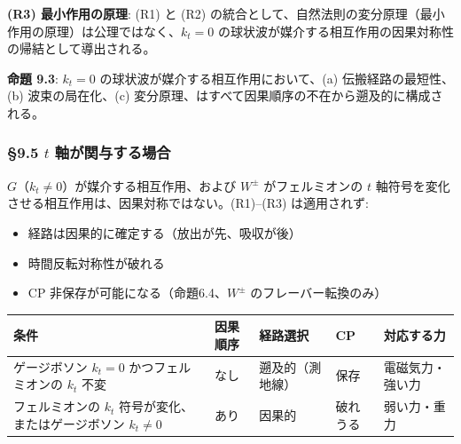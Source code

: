 \documentclass[
  a4paper,11pt]{ltjsarticle}
\newcounter{none}
\providecommand{\tightlist}{%
  \setlength{\itemsep}{0pt}\setlength{\parskip}{0pt}}
\theoremstyle{definition}
\theoremstyle{remark}
\begin{document}
\textbf{(R3) 最小作用の原理}: (R1) と (R2)
の統合として、自然法則の変分原理（最小作用の原理）は公理ではなく、\(k_t = 0\)
の球状波が媒介する相互作用の因果対称性の帰結として導出される。

\textbf{命題 9.3}: \(k_t = 0\) の球状波が媒介する相互作用において、(a)
伝搬経路の最短性、(b) 波束の局在化、(c)
変分原理、はすべて因果順序の不在から遡及的に構成される。

\subsubsection{\texorpdfstring{§9.5 \(t\)
軸が関与する場合}{§9.5 t 軸が関与する場合}}\label{t-ux8ef8ux304cux95a2ux4e0eux3059ux308bux5834ux5408}

\(G\)（\(k_t \neq 0\)）が媒介する相互作用、および \(W^{\pm}\)
がフェルミオンの \(t\)
軸符号を変化させる相互作用は、因果対称ではない。(R1)--(R3) は適用されず:

\begin{itemize}
\tightlist
\item
  経路は因果的に確定する（放出が先、吸収が後）
\item
  時間反転対称性が破れる
\item
  CP 非保存が可能になる（命題6.4、\(W^{\pm}\) のフレーバー転換のみ）
\end{itemize}

{\def\LTcaptype{none} %
\begin{longtable}[]{@{}
  >{\raggedright\arraybackslash}p{}
  >{\raggedright\arraybackslash}p{}
  >{\raggedright\arraybackslash}p{}
  >{\raggedright\arraybackslash}p{}
  >{\raggedright\arraybackslash}p{}@{}}
\toprule\noalign{}
\begin{minipage}[b]{\linewidth}\raggedright
条件
\end{minipage} & \begin{minipage}[b]{\linewidth}\raggedright
因果順序
\end{minipage} & \begin{minipage}[b]{\linewidth}\raggedright
経路選択
\end{minipage} & \begin{minipage}[b]{\linewidth}\raggedright
CP
\end{minipage} & \begin{minipage}[b]{\linewidth}\raggedright
対応する力
\end{minipage} \\
\midrule\noalign{}
\endhead
\bottomrule\noalign{}
\endlastfoot
ゲージボソン \(k_t = 0\) かつフェルミオンの \(k_t\) 不変 & なし &
遡及的（測地線） & 保存 & 電磁気力・強い力 \\
フェルミオンの \(k_t\) 符号が変化、またはゲージボソン \(k_t \neq 0\) &
あり & 因果的 & 破れうる & 弱い力・重力 \\
\end{longtable}
}
\end{document}
